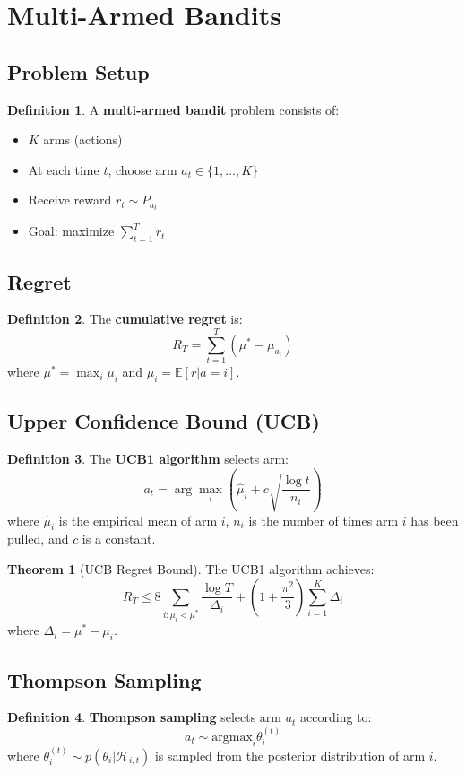 \documentclass[11pt]{article}
\theoremstyle{definition}
\newtheorem{definition}{Definition}[section]
\newtheorem{theorem}{Theorem}[section]
\begin{document}
\section{Multi-Armed Bandits}

\subsection{Problem Setup}
\begin{definition}
A \textbf{multi-armed bandit} problem consists of:
\begin{itemize}
    \item $K$ arms (actions)
    \item At each time $t$, choose arm $a_t \in \{1, \ldots, K\}$
    \item Receive reward $r_t \sim P_{a_t}$
    \item Goal: maximize $\sum_{t=1}^T r_t$
\end{itemize}
\end{definition}

\subsection{Regret}
\begin{definition}
The \textbf{cumulative regret} is:
$$R_T = \sum_{t=1}^T (\mu^* - \mu_{a_t})$$
where $\mu^* = \max_i \mu_i$ and $\mu_i = \mathbb{E}[r|a = i]$.
\end{definition}

\subsection{Upper Confidence Bound (UCB)}
\begin{definition}
The \textbf{UCB1 algorithm} selects arm:
$$a_t = \arg\max_{i} \left(\hat{\mu}_i + c\sqrt{\frac{\log t}{n_i}}\right)$$
where $\hat{\mu}_i$ is the empirical mean of arm $i$, $n_i$ is the number of times arm $i$ has been pulled, and $c$ is a constant.
\end{definition}

\begin{theorem}[UCB Regret Bound]
The UCB1 algorithm achieves:
$$R_T \leq 8 \sum_{i: \mu_i < \mu^*} \frac{\log T}{\Delta_i} + \left(1 + \frac{\pi^2}{3}\right) \sum_{i=1}^K \Delta_i$$
where $\Delta_i = \mu^* - \mu_i$.
\end{theorem}

\subsection{Thompson Sampling}
\begin{definition}
\textbf{Thompson sampling} selects arm $a_t$ according to:
$$a_t \sim \text{argmax}_i \theta_i^{(t)}$$
where $\theta_i^{(t)} \sim p(\theta_i|\mathcal{H}_{i,t})$ is sampled from the posterior distribution of arm $i$.
\end{definition}
\end{document}
